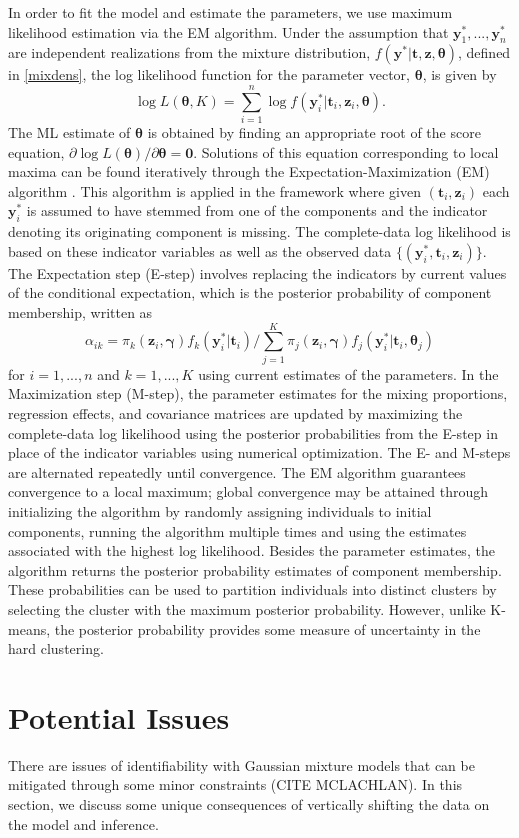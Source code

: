 \documentclass[12pt]{article}
\newcommand{\B}[0]{\mathbf}
\newcommand{\bs}[0]{\boldsymbol}
\begin{document}
In order to fit the model and estimate the parameters, we use maximum likelihood estimation via the EM algorithm. Under the assumption that $\B y^{*}_{1},...,\B y^{*}_{n}$ are independent realizations from the mixture distribution, $f(\B y^{*} | \B t, \B z, \bs\theta)$, defined in \ref{mixdens}, the log likelihood function for the parameter vector, $\bs \theta$, is given by
$$\log L(\bs\theta,K)=\sum^{n}_{i=1}\log f(\B y^{*}_{i}|\B t_{i},\B z_{i},\bs \theta).$$
The ML estimate of $\bs\theta$ is obtained by finding an appropriate root of the score equation, $\partial \log L(\bs\theta)/\partial \bs\theta=\B 0.$ Solutions of this equation corresponding to local maxima can be found iteratively through the Expectation-Maximization (EM) algorithm \cite{dempster1977}. This algorithm is applied in the framework where given $(\B t_{i},\B z_{i})$ each $\B y^{*}_{i}$ is assumed to have stemmed from one of the components and the indicator denoting its originating component is missing. The complete-data log likelihood is based on these indicator variables as well as the observed data $\{(\B y^{*}_{i}, \B t_{i}, \B z_{i})\}$. The Expectation step (E-step) involves replacing the indicators by current values of the conditional expectation, which is the posterior probability of component membership, written as
$$\alpha_{ik}=\pi_{k}(\B z_{i},\bs\gamma)f_{k}(\B y^{*}_{i}|\B t_{i})/\sum_{j=1}^{K}\pi_{j}(\B z_{i},\bs\gamma)f_{j}(\B y^{*}_{i}|\B t_{i},\bs \theta_{j})$$
for $i=1,...,n$ and $k=1,...,K$ using current estimates of the parameters. In the Maximization step (M-step), the parameter estimates for the mixing proportions, regression effects, and covariance matrices are updated by maximizing the complete-data log likelihood using the posterior probabilities from the E-step in place of the indicator variables using numerical optimization. The E- and M-steps are alternated repeatedly until convergence. The EM algorithm guarantees convergence to a local maximum; global convergence may be attained through initializing the algorithm by randomly assigning individuals to initial components, running the algorithm multiple times and using the estimates associated with the highest log likelihood. Besides the parameter estimates, the algorithm returns the posterior probability estimates of component membership. These probabilities can be used to partition individuals into distinct clusters by selecting the cluster with the maximum posterior probability. However, unlike K-means, the posterior probability provides some measure of uncertainty in the hard clustering. 
\section{Potential Issues}
There are issues of identifiability with Gaussian mixture models that can be mitigated through some minor constraints (CITE MCLACHLAN). In this section, we discuss some unique consequences of vertically shifting the data on the model and inference.
\end{document}

